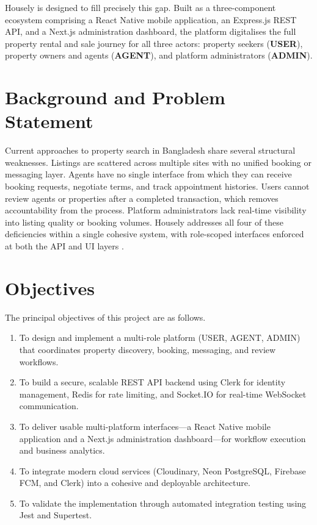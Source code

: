 \documentclass[12pt,a4paper]{report}
\begin{document}
Housely is designed to fill precisely this gap. Built as a three-component ecosystem
comprising a React Native mobile application, an Express.js REST API, and a Next.js
administration dashboard, the platform digitalises the full property rental and sale journey
for all three actors: property seekers (\textbf{USER}), property owners and agents
(\textbf{AGENT}), and platform administrators (\textbf{ADMIN}).

\section{Background and Problem Statement}

Current approaches to property search in Bangladesh share several structural weaknesses.
Listings are scattered across multiple sites with no unified booking or messaging layer.
Agents have no single interface from which they can receive booking requests, negotiate
terms, and track appointment histories. Users cannot review agents or properties after a
completed transaction, which removes accountability from the process. Platform
administrators lack real-time visibility into listing quality or booking volumes. Housely
addresses all four of these deficiencies within a single cohesive system, with role-scoped
interfaces enforced at both the API and UI layers \cite{bproperty2023, kleppmann2017}.

\section{Objectives}

The principal objectives of this project are as follows.

\begin{enumerate}[noitemsep]
  \item To design and implement a multi-role platform (USER, AGENT, ADMIN) that
        coordinates property discovery, booking, messaging, and review workflows.
  \item To build a secure, scalable REST API backend using Clerk for identity management,
        Redis for rate limiting, and Socket.IO for real-time WebSocket communication.
  \item To deliver usable multi-platform interfaces---a React Native mobile application and
        a Next.js administration dashboard---for workflow execution and business analytics.
  \item To integrate modern cloud services (Cloudinary, Neon PostgreSQL, Firebase FCM,
        and Clerk) into a cohesive and deployable architecture.
  \item To validate the implementation through automated integration testing using Jest
        and Supertest.
\end{enumerate}
\end{document}
